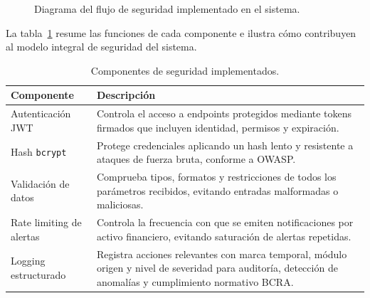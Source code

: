   \begin{figure}[H]
  \centering
  \caption{Diagrama del flujo de seguridad implementado en el sistema.}
  \label{fig:seguridad-flujo}
  \end{figure}

  La tabla~\ref{tab:seguridad-descriptivo} resume las funciones de cada componente e ilustra  
  cómo contribuyen al modelo integral de seguridad del sistema.
  

  \begin{table}[H]
  \caption{Componentes de seguridad implementados.}
  \label{tab:seguridad-descriptivo}
  \centering
  \renewcommand{\arraystretch}{1.25}
  \begin{tabularx}{0.98\textwidth}{l X}
  \toprule
  \textbf{Componente} & \textbf{Descripción} \\
  \midrule
  Autenticación JWT &
  Controla el acceso a endpoints protegidos mediante tokens firmados que incluyen identidad,  
  permisos y expiración. \\
  \midrule
  Hash \texttt{bcrypt} &
  Protege credenciales aplicando un hash lento y resistente a ataques de fuerza bruta,        
  conforme a OWASP. \\
  \midrule
  Validación de datos &
  Comprueba tipos, formatos y restricciones de todos los parámetros recibidos, evitando       
  entradas malformadas o maliciosas. \\
  \midrule
  Rate limiting de alertas &
  Controla la frecuencia con que se emiten notificaciones por activo financiero, evitando     
  saturación de alertas repetidas. \\
  \midrule
  Logging estructurado &
  Registra acciones relevantes con marca temporal, módulo origen y nivel de severidad para    
  auditoría, detección de anomalías y cumplimiento normativo BCRA. \\
  \bottomrule
  \end{tabularx}
  \end{table}



